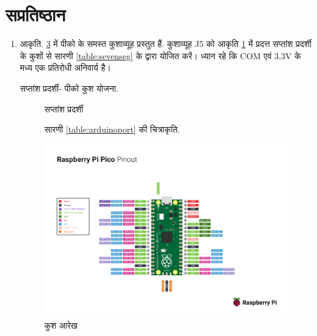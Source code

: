 \documentclass[journal,12pt,twocolumn]{IEEEtran}
\renewcommand\thesection{\arabic{section}}
\begin{document}
\section{सप्रतिष्ठान}
\renewcommand{\theequation}{\theenumi}
\renewcommand{\thefigure}{\theenumi}
\begin{enumerate}[label=\thesection.\arabic*.,ref=\thesection.\theenumi]

\item आकृति. \ref{fig:pin_sheet} में   पीको  के समस्त कुशाव्यूह  प्रस्तुत हैं.  कुशाव्यूह J5 को  आकृति \ref{fig:sevenseg} में प्रदत्त सप्तांश प्रदर्शी के कुशों से सारणी \ref{table:sevenseg} के द्वारा योजित करें। ध्यान  रहे कि COM एवं 3.3V के मध्य एक प्रतिरोधी अनिवार्य है। 
\begin{table}[!ht]
\centering
\resizebox{\columnwidth}{!}{

}
\caption{सप्तांश प्रदर्शी- पीको  कुश योजना.}
\label{table:sevenseg}
\end{table}

\begin{figure}[!ht]
\centering
\resizebox{\columnwidth}{!}{

}
\caption{सप्तांश प्रदर्शी}
\label{fig:sevenseg}
\end{figure}
\begin{figure}[!ht]
\centering
\resizebox{\columnwidth}{!}{

}
\caption{सारणी \ref{table:arduinoport} की चित्राकृति. }
\label{fig:sevenseg12}
\end{figure}


\begin{figure}[!ht]
\centering
\includegraphics[width = \textwidth]{figs/pin_sheet.pdf}
\caption{कुश आरेख}
\label{fig:pin_sheet}
\end{figure}




\end{enumerate}
\end{document}
